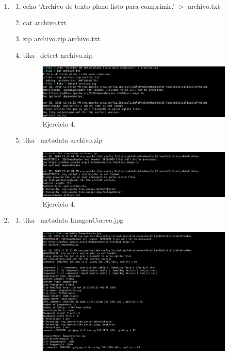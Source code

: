 \documentclass{article}
\begin{document}
\begin{enumerate}
    \item
        \begin{enumerate}
            \item echo `Archivo de texto plano listo para comprimir.' $>$ archivo.txt
            \item cat archivo.txt
            \item zip archivo.zip archivo.txt
            \item tika --detect archivo.zip
                \begin{figure}[H]
                \centering
                \includegraphics[width=0.7\linewidth]{./ej4}
                \caption{Ejercicio 4.}
                \end{figure}
            \item tika --metadata archivo.zip
                \begin{figure}[H]
                \centering
                \includegraphics[width=0.7\linewidth]{./ej5}
                \caption{Ejercicio 4.}
                \end{figure}
        \end{enumerate}
    \item
        \begin{enumerate}
            \item tika --metadata ImagenCorreo.jpg
                \begin{figure}[H]
                \centering
                \includegraphics[width=0.7\linewidth]{./ej6}

\end{figure}
\end{enumerate}
\end{enumerate}
\end{document}
